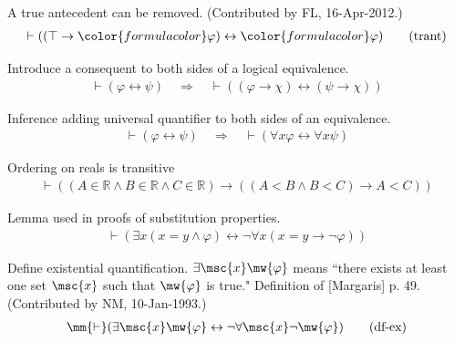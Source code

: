 \begin{lemma} A true antecedent can be removed.  (Contributed
by FL, 16-Apr-2012.)
\begin{align}
\vdash ( ( \top \rightarrow {\color{formulacolor}\varphi} ) \leftrightarrow
    {\color{formulacolor}\varphi} )\label{eq:trant}\tag{trant}
\end{align}
\end{lemma}



\begin{lemma} Introduce a consequent to both sides of a
logical equivalence.
\begin{align}
\vdash ( \varphi \leftrightarrow \psi )\quad\Rightarrow\quad \vdash ( ( \varphi
    \rightarrow \chi ) \leftrightarrow ( \psi \rightarrow \chi )
    )\label{eq:imbi1i}\tag{imbi1i}
\end{align}
\end{lemma}


\begin{lemma} Inference adding universal quantifier to both
sides of an equivalence.
\begin{align}
\vdash ( \varphi \leftrightarrow \psi )\quad\Rightarrow\quad \vdash ( \forall x
    \varphi \leftrightarrow \forall x \psi )\label{eq:albii}\tag{albii}
\end{align}
\end{lemma}


\begin{lemma} Ordering on reals is transitive
\begin{align}
\vdash ( ( A \in \mathbb{R} \wedge B \in \mathbb{R} \wedge C \in \mathbb{R} )
    \rightarrow ( ( A < B \wedge B < C ) \rightarrow A < C )
    )\label{eq:lttr}\tag{lttr}
\end{align}
\end{lemma}


\begin{lemma} Lemma used in proofs of substitution
properties. 
\begin{align}
\vdash ( \exists x ( x = y \wedge \varphi ) \leftrightarrow \lnot \forall x ( x
    = y \rightarrow \lnot \varphi ) )\label{eq:equs3}\tag{equs3}
\end{align}
\end{lemma}


\begin{metadefinition} Define existential quantification.
$\exists \msc{x} \mw{\varphi}$ means ``there exists at
     least one set $\msc{x}$ such that $\mw{\varphi}$ is true."  Definition of
[Margaris]
     p. 49.  (Contributed by NM, 10-Jan-1993.)
\begin{align}
\mm{\vdash} ( \exists \msc{x} \mw{\varphi} \leftrightarrow \lnot \forall
    \msc{x} \lnot \mw{\varphi} )\label{eq:df-ex}\tag{df-ex}
\end{align}
\end{metadefinition}


